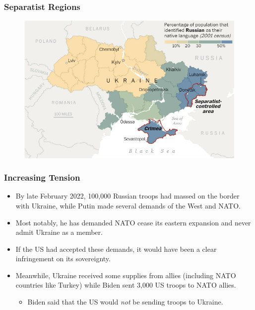 \documentclass[handout]{beamer}
\begin{document}
\begin{frame} 
	\frametitle{\LARGE{Separatist Regions}}
	\begin{figure}[ht!]
		\centering
		\includegraphics[width=\textwidth,height=\textheight, keepaspectratio]{sep2.png}
	\end{figure}
\end{frame}

\begin{frame} 
	\frametitle{\LARGE{Increasing Tension}}
	\begin{itemize}
		\item By late February 2022, 100,000 Russian troops had massed on the border with Ukraine, while Putin made several demands of the West and NATO. \pause
		\item Most notably, he has demanded NATO cease its eastern expansion and never admit Ukraine as a member. \pause
		\item If the US had accepted these demands, it would have been a clear infringement on its sovereignty. \pause
		\item Meanwhile, Ukraine received some supplies from allies (including NATO countries like Turkey) while Biden sent 3,000 US troops to NATO allies.
		\begin{itemize}
			\item Biden said that the US would \textit{not} be sending troops to Ukraine.
		\end{itemize}
	\end{itemize}
\end{frame}
\end{document}
